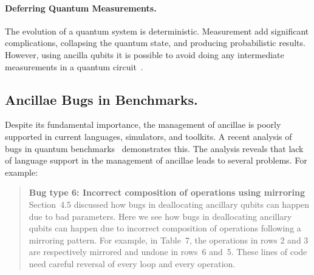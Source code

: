 \documentclass[sigplan,10pt,review,anonymous]{acmart}
\begin{document}
\paragraph*{Deferring Quantum Measurements.} The evolution of a
quantum system is deterministic. Measurement add significant
complications, collapsing the quantum state, and producing
probabilistic results. However, using ancilla qubits it is possible to
avoid doing any intermediate measurements in a quantum
circuit~\cite{dewolf}.

\subsection{Ancillae Bugs in Benchmarks.}
Despite its fundamental importance, the management of ancillae is
poorly supported in current languages, simulators, and toolkits.
A recent analysis of bugs in quantum
benchmarks~\cite{DBLP:conf/oopsla/HuangM18} demonstrates this. The analysis
reveals that lack of language support in the management of ancillae leads to
several problems. For example:
\begin{quote}
  \textbf{Bug type 6: Incorrect composition of operations using mirroring}
  Section~4.5 discussed how bugs in deallocating ancillary qubits can
  happen due to bad parameters. Here we see how bugs in deallocating
  ancillary qubits can happen due to incorrect composition of
  operations following a mirroring pattern. For example, in Table~7,
  the operations in rows 2 and 3 are respectively mirrored and undone
  in rows~6 and~5. These lines of code need careful reversal of every
  loop and every operation.
\end{quote}
\end{document}
